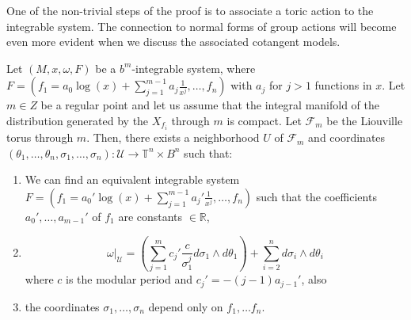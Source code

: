 One of the non-trivial steps of the proof is to associate a toric action to the integrable system. The connection to normal forms of group actions will become even more evident when we discuss the associated cotangent models.



\begin{theoremA}
Let $(M,x,\omega, F)$ be a $b^m$-integrable system, where $F = (f_1 = a_0 \log(x) + \sum_{j=1}^{m-1} a_j\frac{1}{x^j}, \ldots,f_n)$ with $a_j$  for $j>1$ functions in $x$. Let $m\in Z$ be a regular point and let us assume that the integral manifold of the distribution generated by the $X_{f_i}$ through $m$ is compact. Let $\mathcal{F}_m$ be the Liouville torus through $m$.
Then, there exists a neighborhood $U$ of $\mathcal{F}_m$ and coordinates $(\theta_1,\ldots,\theta_n,\sigma_1,\ldots,\sigma_n):\mathcal{U}\rightarrow\mathbb{T}^n\times B^n$ such that:

\begin{enumerate}
\item We can find an equivalent integrable system $F = (f_1 = a_0'\log(x) + \sum_{j=1}^{m-1} a_j'\frac{1}{x^j}, \ldots, f_n)$ such that the coefficients $a_0',\ldots, a_{m-1}' $ of $f_1$ are constants $\in \mathbb{R}$,
\item $$\omega|_\mathcal{U} = \left(\sum_{j=1}^m c_j'\frac{c}{\sigma_1^j}d\sigma_1\wedge d\theta_1\right) + \sum_{i=2}^{n} d \sigma_i\wedge d\theta_i$$ where $c$ is the modular period and $c_j' = -(j-1)a_{j-1}'$, also
\item the coordinates $\sigma_1,\ldots,\sigma_n$ depend only on $f_1,\ldots f_n$.
\end{enumerate}

\end{theoremA}

